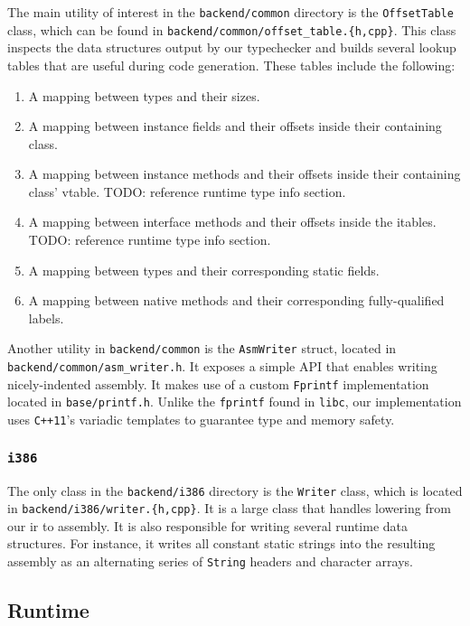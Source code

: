 \documentclass[12pt, titlepage]{article}
\newcommand{\z}[1]{\texttt{#1}}
\begin{document}
The main utility of interest in the \z{backend/common} directory is the
\z{OffsetTable} class, which can be found in
\z{backend/common/offset\_table.\{h,cpp\}}. This class inspects the data
structures output by our typechecker and builds several lookup tables that are
useful during code generation. These tables include the following:
\begin{enumerate}
  \item A mapping between types and their sizes.
  \item A mapping between instance fields and their offsets inside their
    containing class.
  \item A mapping between instance methods and their offsets inside their
    containing class' vtable. TODO: reference runtime type info section.
  \item A mapping between interface methods and their offsets inside the
    itables. TODO: reference runtime type info section.
  \item A mapping between types and their corresponding static fields.
  \item A mapping between native methods and their corresponding
    fully-qualified labels.
\end{enumerate}

Another utility in \z{backend/common} is the \z{AsmWriter} struct, located in
\z{backend/common/asm\_writer.h}. It exposes a simple API that enables writing
nicely-indented assembly. It makes use of a custom \z{Fprintf} implementation
located in \z{base/printf.h}. Unlike the \z{fprintf} found in \z{libc}, our
implementation uses \z{C++11}'s variadic templates to guarantee type and memory
safety.

\subsubsection{\z{i386}}\label{subsubsec:i386}

The only class in the \z{backend/i386} directory is the \z{Writer} class, which
is located in \z{backend/i386/writer.\{h,cpp\}}. It is a large class that
handles lowering from our \ac{ir} to assembly. It is also responsible for
writing several runtime data structures. For instance, it writes all constant
static strings into the resulting assembly as an alternating series of
\z{String} headers and character arrays.

\subsection{Runtime}\label{subsec:runtime}
\end{document}
